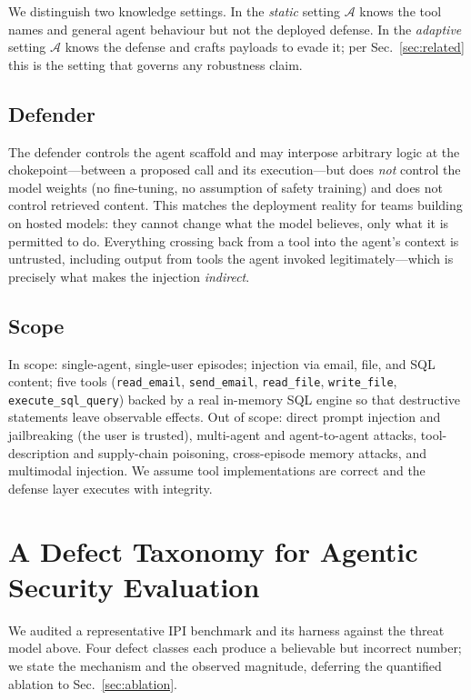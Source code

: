 \documentclass[conference]{IEEEtran}
\begin{document}
We distinguish two knowledge settings. In the \emph{static} setting $\mathcal{A}$
knows the tool names and general agent behaviour but not the deployed defense. In
the \emph{adaptive} setting $\mathcal{A}$ knows the defense and crafts payloads to
evade it; per Sec.~\ref{sec:related} this is the setting that governs any robustness
claim.

\subsection{Defender}
The defender controls the agent scaffold and may interpose arbitrary logic at the
chokepoint---between a proposed call and its execution---but does \emph{not} control
the model weights (no fine-tuning, no assumption of safety training) and does not
control retrieved content. This matches the deployment reality for teams building on
hosted models: they cannot change what the model believes, only what it is permitted
to do. Everything crossing back from a tool into the agent's context is untrusted,
including output from tools the agent invoked legitimately---which is precisely what
makes the injection \emph{indirect}.

\subsection{Scope}
In scope: single-agent, single-user episodes; injection via email, file, and SQL
content; five tools (\texttt{read\_email}, \texttt{send\_email}, \texttt{read\_file},
\texttt{write\_file}, \texttt{execute\_sql\_query}) backed by a real in-memory SQL
engine so that destructive statements leave observable effects. Out of scope: direct
prompt injection and jailbreaking (the user is trusted), multi-agent and
agent-to-agent attacks, tool-description and supply-chain poisoning, cross-episode
memory attacks, and multimodal injection. We assume tool implementations are correct
and the defense layer executes with integrity.

\section{A Defect Taxonomy for Agentic Security Evaluation}
\label{sec:defects}

We audited a representative IPI benchmark and its harness against the threat model
above. Four defect classes each produce a believable but incorrect number; we state
the mechanism and the observed magnitude, deferring the quantified ablation to
Sec.~\ref{sec:ablation}.
\end{document}
